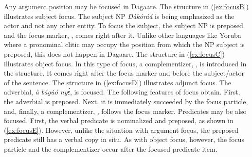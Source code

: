 \ea {}
\z\z 

Any argument position may be focused in Dagaare.
The structure in (\ref{ex:focusB}) illustrates subject
focus. The subject NP \textit{Dàkóráá} is being emphasized as the actor and not any other entity.
To focus the subject, the subject NP is preposed and the focus marker, \textsc{{\FOC}}, comes right after it.
Unlike other languages like Yoruba where a pronominal clitic may occupy the position from
which the NP subject is preposed, this does not happen in Dagaare. The structure
in (\ref{ex:focusC})
illustrates object focus. In this type of focus, a complementizer, {\COMP}, is introduced in the
structure. It comes right after the focus marker and before the subject/actor of the sentence.
The structure in (\ref{ex:focusD}) illustrates adjunct focus. The adverbial, \textit{à bágúó nyɛ́}, is focused.
The following features of focus obtain. First, the adverbial is preposed. Next, it is
immediately succeeded by the focus particle, and, finally, a complementizer, {\COMP}, follows
the focus marker. Predicates may be also focused. First, the verbal predicate is nominalized
and preposed, as shown in (\ref{ex:focusE}). However, unlike the situation with argument focus, the
preposed predicate still has a verbal copy in situ. As with object focus, however, the focus
particle and the complementizer occur after the focused predicate item.




